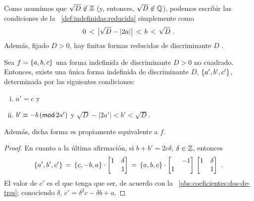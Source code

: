 \begin{obsIndefinidas}\label{obs:indefinidas:reducida}
	Como asumimos que $\sqrt D\not\in\Enteros$ (y, entonces,
	$\sqrt D\not\in\Racionales$), podemos escribir las condiciones
	de la ~\ref{def:indefinidas:reducida} simplemente como
	\begin{displaymath}
		0\,<\,\big|\sqrt D-|2a|\big|\,<\,b\,<\,\sqrt D
		\dispstop
	\end{displaymath}
	Adem\'as, fijado $D>0$, hay finitas formas reducidas de
	discriminante $D$ \quedacomoejercicio.
\end{obsIndefinidas}

\begin{lemaIndefinidas}\label{lema:vecina}
	Sea $f=\binaria{a,b,c}$ una forma indefinida de discriminante
	$D>0$ no cuadrado. Entonces, existe una \'unica forma indefinida
	de discriminante $D$, $\binaria{a',b',c'}$, determinada por las
	siguientes condiciones:
	\begin{enumerate}[(i)]
		\item\label{item:lema:vecina:primer}
			$a'=c$ y
		\item\label{item:lema:vecina:segundo}
			$b'\equiv -b\tmodulo[2a']$ y
			$\sqrt D-|2a'|<b'<\sqrt D$.
	\end{enumerate}
	Adem\'as, dicha forma es propiamente equivalente a $f$.
\end{lemaIndefinidas}

\begin{proof}
	En cuanto a la \'ultima afirmaci\'on,
	si $b+b'=2c\delta$, $\delta\in\Enteros$, entonces
	\begin{displaymath}
		\binaria{a',b',c'}\,=\, \binaria{c,-b,a}\cdot
			\begin{bmatrix}
				1 & \delta \\ & 1
			\end{bmatrix}
			\,=\,\binaria{a,b,c}\cdot
				\begin{bmatrix}
					& -1 \\ 1 &
				\end{bmatrix}\,
				\begin{bmatrix}
					1 & \delta \\ & 1
				\end{bmatrix}
		\dispstop
	\end{displaymath}
	El valor de $c'$ es el que tenga que ser, de acuerdo con la
	\obsname~\ref{obs:coeficientes:dos-de-tres}; conociendo $\delta$,
	$c'=\delta^2c-\delta b+a$.
\end{proof}

